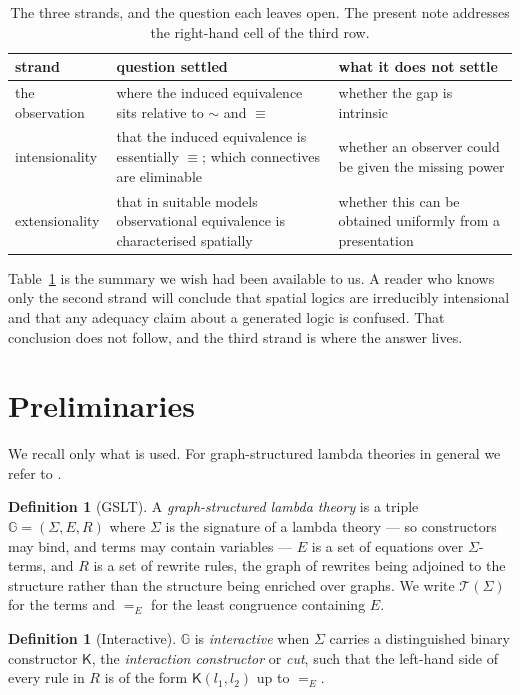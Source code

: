 \documentclass[11pt]{article}
\theoremstyle{plain}
\theoremstyle{definition}
\newtheorem{definition}[theorem]{Definition}
\newcommand{\Kc}{\mathsf{K}}
\newcommand{\Gg}{\mathbb{G}}
\newcommand{\bis}{\sim}
\newcommand{\Terms}{\mathcal{T}}
\begin{document}
\begin{table}[t]
\centering
\begin{tabular}{@{}p{3.1cm}p{5.2cm}p{5.2cm}@{}}
\toprule
\textbf{strand} & \textbf{question settled} & \textbf{what it does not settle} \\
\midrule
the observation & where the induced equivalence sits relative to $\bis$ and $\equiv$ &
whether the gap is intrinsic \\
intensionality & that the induced equivalence is essentially $\equiv$; which connectives are
eliminable & whether an observer could be given the missing power \\
extensionality & that in suitable models observational equivalence is characterised spatially &
whether this can be obtained uniformly from a presentation \\
\bottomrule
\end{tabular}
\caption{The three strands, and the question each leaves open. The present note addresses the
right-hand cell of the third row.}
\label{tab:lineages}
\end{table}

Table~\ref{tab:lineages} is the summary we wish had been available to us. A reader who knows only the
second strand will conclude that spatial logics are irreducibly intensional and that any adequacy
claim about a generated logic is confused. That conclusion does not follow, and the third strand is
where the answer lives.

\section{Preliminaries}
\label{sec:prelim}

We recall only what is used. For graph-structured lambda theories in general we refer to
\cite{Omnibus}.

\begin{definition}[GSLT]
A \emph{graph-structured lambda theory} is a triple $\Gg = (\Sigma, E, R)$ where $\Sigma$ is the
signature of a lambda theory --- so constructors may bind, and terms may contain variables --- $E$ is
a set of equations over $\Sigma$-terms, and $R$ is a set of rewrite rules, the graph of rewrites being
adjoined to the structure rather than the structure being enriched over graphs. We write $\Terms(\Sigma)$
for the terms and $=_E$ for the least congruence containing $E$.
\end{definition}

\begin{definition}[Interactive]
$\Gg$ is \emph{interactive} when $\Sigma$ carries a distinguished binary constructor $\Kc$, the
\emph{interaction constructor} or \emph{cut}, such that the left-hand side of every rule in $R$ is of
the form $\Kc(l_1, l_2)$ up to $=_E$.
\end{definition}
\end{document}
